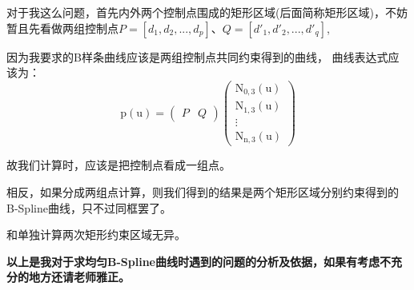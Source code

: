 \documentclass[12pt,a4paper]{article}
\begin{document}
\newpage
对于我这么问题，首先内外两个控制点围成的矩形区域(后面简称矩形区域)，不妨暂且先看做两组控制点$P=[d_1,d_2,...,d_p]$、$Q=[d'_1,d'_2,...,d'_q]$,

因为我要求的B样条曲线应该是两组控制点共同约束得到的曲线，
曲线表达式应该为：
$$
\mathrm{p}(\mathrm{u})=\left(\begin{array}{cc}{P} & {Q}\end{array}\right)\left(\begin{array}{c}{\mathrm{N}_{0, \mathrm{3}}(\mathrm{u})} \\ {\mathrm{N}_{1, \mathrm{3}}(\mathrm{u})} \\ {\vdots} \\ {\mathrm{N}_{\mathrm{n}, \mathrm{3}}(\mathrm{u})}\end{array}\right)
$$

故我们计算时，应该是把控制点看成一组点。


相反，如果分成两组点计算，则我们得到的结果是两个矩形区域分别约束得到的B-Spline曲线，只不过同框罢了。

和单独计算两次矩形约束区域无异。

{\bfseries 以上是我对于求均匀B-Spline曲线时遇到的问题的分析及依据，如果有考虑不充分的地方还请老师雅正。}
     
     
\end{document}
